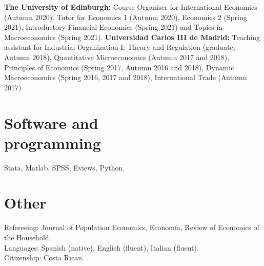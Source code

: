 \documentclass[margin]{res} %
\begin{document}
\begin{resume}
{\bf The University of Edinburgh:} Course Organiser for International Economics (Autumn 2020). Tutor for Economics 1 (Autumn 2020), Economics 2 (Spring 2021), Introductory Financial Economics (Spring 2021) and Topics in Macroeconomics (Spring 2021).
{\bf Universidad Carlos III de Madrid:} Teaching assistant for Industrial Organization I: Theory and Regulation (graduate, Autumn 2018), Quantitative Microeconomics (Autumn 2017 and 2018), Principles of Economics (Spring 2017, Autumn 2016 and 2018), Dynamic Macroeconomics (Spring 2016, 2017 and 2018), International Trade (Autumn 2017)


%

\section{Software and \\ programming}
Stata, Matlab, SPSS, Eviews, Python. \\

\section{Other}
Refereeing: Journal of Population Economics, Econom\'ia, Review of Economics of the Household. \\
Languages: Spanish (native), English (fluent), Italian (fluent). \\
Citizenship: Costa Rican.



\end{resume}
\end{document}
